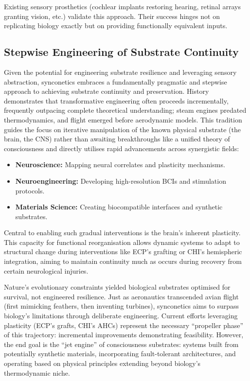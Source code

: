 \documentclass[10pt]{article}
\begin{document}
\begin{sloppypar}
  Existing sensory prosthetics (cochlear implants restoring hearing, retinal arrays granting vision, etc.) validate this approach. Their success hinges not on replicating biology exactly but on providing functionally equivalent inputs.

  \subsection{Stepwise Engineering of Substrate Continuity}
  \label{sec:pragmatic-path-forward}

  Given the potential for engineering substrate resilience and leveraging sensory abstraction, synconetics embraces a fundamentally pragmatic and stepwise approach to achieving substrate continuity and preservation. History demonstrates that transformative engineering often proceeds incrementally, frequently outpacing complete theoretical understanding; steam engines predated thermodynamics, and flight emerged before aerodynamic models. This tradition guides the focus on iterative manipulation of the known physical substrate (the brain, the CNS) rather than awaiting breakthroughs like a unified theory of consciousness and directly utilises rapid advancements across synergistic fields:

  \begin{itemize}
    \item \textbf{Neuroscience:} Mapping neural correlates and plasticity mechanisms.
    \item \textbf{Neuroengineering:} Developing high-resolution BCIs and stimulation protocols.
    \item \textbf{Materials Science:} Creating biocompatible interfaces and synthetic substrates.
  \end{itemize}

  Central to enabling such gradual interventions is the brain’s inherent plasticity. This capacity for functional reorganisation allows dynamic systems to adapt to structural change during interventions like ECP’s grafting or CHI’s hemispheric integration, aiming to maintain continuity much as occurs during recovery from certain neurological injuries.

  Nature’s evolutionary constraints yielded biological substrates optimised for survival, not engineered resilience. Just as aeronautics transcended avian flight (first mimicking feathers, then inventing turbines), synconetics aims to surpass biology’s limitations through deliberate engineering. Current efforts leveraging plasticity (ECP’s grafts, CHI’s AHCs) represent the necessary “propeller phase” of this trajectory: incremental improvements demonstrating feasibility. However, the end goal is the “jet engine” of consciousness substrates: systems built from potentially synthetic materials, incorporating fault-tolerant architectures, and operating based on physical principles extending beyond biology’s thermodynamic niche.


\end{sloppypar}
\end{document}
